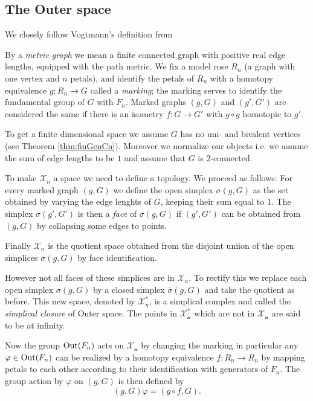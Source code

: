 \subsection{The Outer space}
We closely follow Vogtmann's definition from \cite[p. 2 ff.]{vogtmann16}
\begin{definition}
	By a \emph{metric graph} we mean a finite connected graph with positive real edge lengths, equipped with the path metric.
	We fix a model rose $R_{n}$ (a graph with one vertex and $n$ petals), and identify the petals of $R_{n}$ with a homotopy
	equivalence $g: R_{n} \to  G$ called a \emph{marking}; the marking serves to identify the fundamental group of $G$ with $F_{n}$.
	Marked graphs $(g,G)$ and $(g',G')$ are considered the same if there is an isometry  $f: G \to G'$ with $g \circ g$ homotopic to $g'$.

	To get a finite dimensional space we assume $G$ has no uni- and bivalent vertices (see Theorem \ref{thm:finGenCn}).
	Moreover we normalize our objects i.e. we assume the sum of edge lengths to be $1$ and assume that $G$ is $2$-connected.
\end{definition}
To make  $\mathcal{X}_{n}$ a space we need to define a topology. We proceed as follows: 
For every marked graph $(g,G)$ we define the open simplex $\sigma(g,G)$ as the set obtained by varying the edge lenghts of $G$,
keeping their sum equal to $1$.
The simplex  $\sigma(g',G')$ is then a \emph{face} of $\sigma(g,G)$ if $(g',G')$ can be obtained from $(g,G)$ by collapsing some edges to points.

Finally $\mathcal{X}_{n}$ is the quotient space obtained from the disjoint uniion of the open simplices $\sigma(g,G)$ by face identification.

However not all faces of these simplices are in $\mathcal{X}_{n}$.
To rectify this we replace each open simplex $\sigma(g,G)$ by a closed simplex $\overline{\sigma}(g,G)$ and take
the quotient as before. This new space, denoted by $\mathcal{X}^{*}_{n}$, is a simplical complex and called the \emph{simplical closure} of Outer space.
The points in $\mathcal{X^{*}_{n}}$ which are not in $\mathcal{X_{n}}$ are said to be at infinity.

 Now the group $\operatorname{Out}(F_{n})$ acts on $\mathcal{X_{n}}$ by changing the marking in particular
 any $\varphi \in \operatorname{Out}(F_{n})$ can be realized by a homotopy equivalence $f: R_{n} \to R_{n}$
 by mapping petals to each other according to their identification with generators of $F_{n}$.
 The group action by $\varphi$ on $(g,G)$ is then defined by
 \[
	 (g,G) \varphi = (g \circ f, G)
 .\] 


